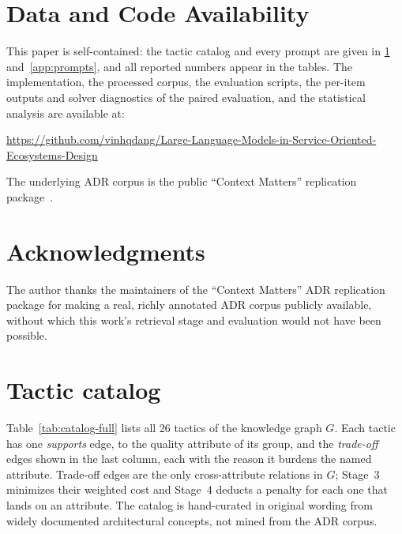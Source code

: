 \documentclass[preprint,12pt,authoryear]{elsarticle}
\renewcommand{\_}{\textunderscore\allowbreak{}}
\begin{document}
\section*{Data and Code Availability}
This paper is self-contained: the tactic catalog and every prompt are given in \ref{app:catalog} and~\ref{app:prompts}, and all reported numbers appear in the tables. The implementation, the processed corpus, the evaluation scripts, the per-item outputs and solver diagnostics of the paired evaluation, and the statistical analysis are available at:

\begin{center}
\footnotesize\url{https://github.com/vinhqdang/Large-Language-Models-in-Service-Oriented-Ecosystems-Design}
\end{center}

The underlying ADR corpus is the public ``Context Matters'' replication package~\citep{contextmatters-zenodo}.

\section*{Acknowledgments}
The author thanks the maintainers of the ``Context Matters'' ADR replication package for making a real, richly annotated ADR corpus publicly available, without which this work's retrieval stage and evaluation would not have been possible.


\appendix
\section{Tactic catalog}
\label{app:catalog}

Table~\ref{tab:catalog-full} lists all 26 tactics of the knowledge graph $G$. Each tactic has one \emph{supports} edge, to the quality attribute of its group, and the \emph{trade-off} edges shown in the last column, each with the reason it burdens the named attribute. Trade-off edges are the only cross-attribute relations in $G$; Stage~3 minimizes their weighted cost and Stage~4 deducts a penalty for each one that lands on an attribute. The catalog is hand-curated in original wording from widely documented architectural concepts, not mined from the ADR corpus.
\end{document}
